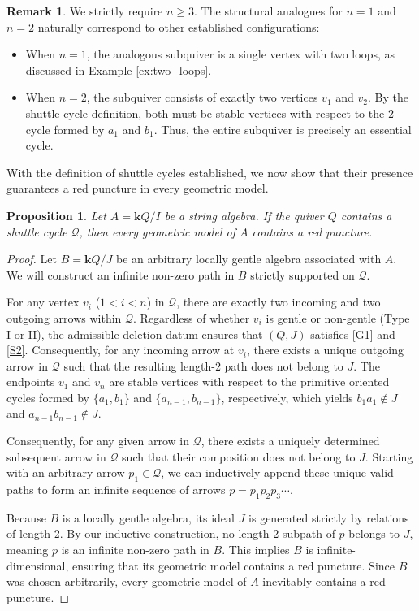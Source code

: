 \documentclass[11pt]{amsart}
\numberwithin{equation}{section}
\newtheorem{proposition}[theorem]{Proposition}
\theoremstyle{definition}
\newtheorem{remark}[theorem]{Remark}
\begin{document}
\begin{remark}\label{remark:shuttle_n_ge_3}
We strictly require $n \ge 3$. The structural analogues for $n=1$ and $n=2$ naturally correspond to other established configurations: 
\begin{itemize}
    \item When $n=1$, the analogous subquiver is a single vertex with two loops, as discussed in Example \ref{ex:two_loops}.
    \item When $n=2$, the subquiver consists of exactly two vertices $v_1$ and $v_2$. By the shuttle cycle definition, both must be stable vertices with respect to the 2-cycle formed by $a_1$ and $b_1$. Thus, the entire subquiver is precisely an essential cycle.
\end{itemize}
\end{remark}

With the definition of shuttle cycles established, we now show that their presence guarantees a red puncture in every geometric model.

\begin{proposition}\label{prop:shuttle_cycle}
Let $A = \mathbf{k}Q/I$ be a string algebra. If the quiver $Q$ contains a shuttle cycle $\mathcal{Q}$, then every geometric model of $A$ contains a red puncture.
\end{proposition}

\begin{proof}
Let $B = \mathbf{k}Q/J$ be an arbitrary locally gentle algebra associated with $A$. We will construct an infinite non-zero path in $B$ strictly supported on $\mathcal{Q}$.

For any  vertex $v_i$ ($1 < i < n$) in $\mathcal{Q}$, there are exactly two incoming and two outgoing arrows within $\mathcal{Q}$. Regardless of whether \(v_i\) is gentle or non-gentle (Type I or II), the admissible deletion datum ensures that $(Q,J)$ satisfies \ref{G1}  and \ref{S2}. Consequently, for any incoming arrow at $v_i$, there exists a unique outgoing arrow in $\mathcal{Q}$ such that the resulting length-$2$ path does not belong to $J$. The endpoints $v_1$ and $v_n$ are stable vertices with respect to the primitive oriented cycles formed by $\{a_1,b_1\}$ and $\{a_{n-1},b_{n-1}\}$, respectively, which yields $b_1 a_1 \notin J$ and $a_{n-1} b_{n-1} \notin J$. 

Consequently, for any given arrow in $\mathcal{Q}$, there exists a uniquely determined subsequent arrow in $\mathcal{Q}$ such that their composition does not belong to $J$. Starting with an arbitrary arrow $p_1 \in \mathcal{Q}$, we can inductively append these unique valid paths to form an infinite sequence of arrows $p = p_1 p_2 p_3 \cdots$. 

Because $B$ is a locally gentle algebra, its ideal $J$ is generated strictly by relations of length 2. By our inductive construction, no length-2 subpath of $p$ belongs to $J$, meaning $p$ is an infinite non-zero path in $B$. This implies $B$ is infinite-dimensional, ensuring that its geometric model contains a red puncture. Since $B$ was chosen arbitrarily, every geometric model of $A$ inevitably contains a red puncture.
\end{proof}
\end{document}
